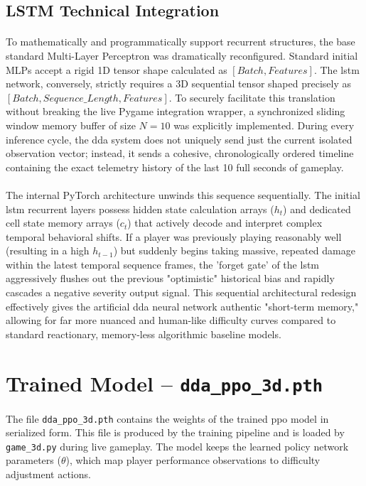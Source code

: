 \subsection{LSTM Technical Integration}
\paragraph{} To mathematically and programmatically support recurrent structures, the base standard Multi-Layer Perceptron was dramatically reconfigured. Standard initial MLPs accept a rigid 1D tensor shape calculated as $[Batch, Features]$. The \ac{lstm} network, conversely, strictly requires a 3D sequential tensor shaped precisely as $[Batch, Sequence\_Length, Features]$. To securely facilitate this translation without breaking the live Pygame integration wrapper, a synchronized sliding window memory buffer of size $N=10$ was explicitly implemented. During every inference cycle, the \ac{dda} system does not uniquely send just the current isolated observation vector; instead, it sends a cohesive, chronologically ordered timeline containing the exact telemetry history of the last 10 full seconds of gameplay.
\paragraph{} The internal PyTorch architecture unwinds this sequence sequentially. The initial \ac{lstm} recurrent layers possess hidden state calculation arrays ($h_t$) and dedicated cell state memory arrays ($c_t$) that actively decode and interpret complex temporal behavioral shifts. If a player was previously playing reasonably well (resulting in a high $h_{t-1}$) but suddenly begins taking massive, repeated damage within the latest temporal sequence frames, the 'forget gate' of the \ac{lstm} aggressively flushes out the previous "optimistic" historical bias and rapidly cascades a negative severity output signal. This sequential architectural redesign effectively gives the artificial \ac{dda} neural network authentic "short-term memory," allowing for far more nuanced and human-like difficulty curves compared to standard reactionary, memory-less algorithmic baseline models.

\section{Trained Model -- \texttt{dda\_ppo\_3d.pth}}
\paragraph{} The file \texttt{dda\_ppo\_3d.pth} contains the weights of the trained \ac{ppo} model in serialized form. This file is produced by the training pipeline and is loaded by \texttt{game\_3d.py} during live gameplay. The model keeps the learned policy network parameters ($\theta$), which map player performance observations to difficulty adjustment actions.

